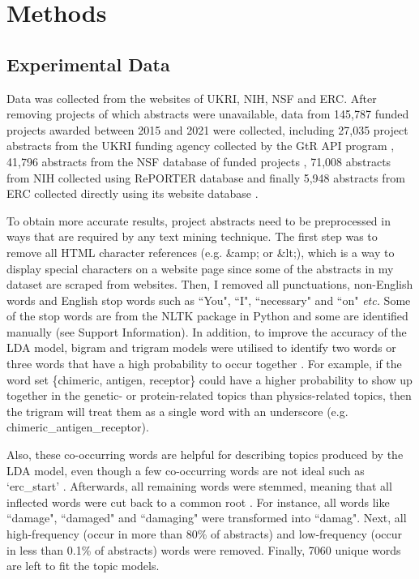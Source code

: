 \section{Methods}

\subsection{Experimental Data}

Data was collected from the websites of UKRI, NIH, NSF and ERC. After removing projects of which abstracts were unavailable, data from 145,787 funded projects awarded between 2015 and 2021 were collected, including 27,035 project abstracts from the UKRI funding agency collected by the GtR API program \cite{UKRI}, 41,796 abstracts from the NSF database of funded projects \cite{NSF}, 71,008 abstracts from NIH collected using RePORTER database and finally 5,948 abstracts from ERC collected directly using its website database \cite{NIH, ERC}.

To obtain more accurate results, project abstracts need to be preprocessed in ways that are required by any text mining technique. The first step was to remove all HTML character references (e.g. \&amp; or \&lt;), which is a way to display special characters on a website page since some of the abstracts in my dataset are scraped from websites. Then, I removed all punctuations, non-English words and English stop words such as ``You", ``I", ``necessary" and ``on" \textit{etc.} Some of the stop words are from the NLTK package in Python and some are identified manually (see Support Information). In addition, to improve the accuracy of the LDA model, bigram and trigram models were utilised to identify two words or three words that have a high probability to occur together \cite{ahmed2009}. For example, if the word set \{chimeric, antigen, receptor\} could have a higher probability to show up together in the genetic- or protein-related topics than physics-related topics, then the trigram will treat them as a single word with an underscore (e.g. chimeric\_antigen\_receptor).

Also, these co-occurring words are helpful for describing topics produced by the LDA model, even though a few co-occurring words are not ideal such as `erc\_start' \cite{sseutm}. Afterwards, all remaining words were stemmed, meaning that all inflected words were cut back to a common root \cite{rbcbaestmro32000a}. For instance, all words like ``damage", ``damaged" and ``damaging" were transformed into ``damag". Next, all high-frequency (occur in more than 80\% of abstracts) and low-frequency (occur in less than 0.1\% of abstracts) words were removed. Finally, 7060 unique words are left to fit the topic models.

